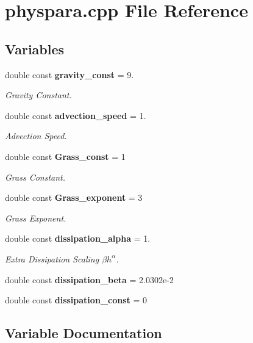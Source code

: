\section{physpara.\-cpp File Reference}
\label{physpara_8cpp}
\subsection*{Variables}
\begin{DoxyCompactItemize}
\item 
double const {\bf gravity\-\_\-const} = 9.
\begin{DoxyCompactList}\small\item\em Gravity Constant. \end{DoxyCompactList}\item 
double const {\bf advection\-\_\-speed} = 1.
\begin{DoxyCompactList}\small\item\em Advection Speed. \end{DoxyCompactList}\item 
double const {\bf Grass\-\_\-const} = 1
\begin{DoxyCompactList}\small\item\em Grass Constant. \end{DoxyCompactList}\item 
double const {\bf Grass\-\_\-exponent} = 3
\begin{DoxyCompactList}\small\item\em Grass Exponent. \end{DoxyCompactList}\item 
double const {\bf dissipation\-\_\-alpha} = 1.
\begin{DoxyCompactList}\small\item\em Extra Dissipation Scaling $ \beta h^\alpha $. \end{DoxyCompactList}\item 
double const {\bf dissipation\-\_\-beta} = 2.\-0302e-\/2
\item 
double const {\bf dissipation\-\_\-const} = 0
\end{DoxyCompactItemize}


\subsection{Variable Documentation}
